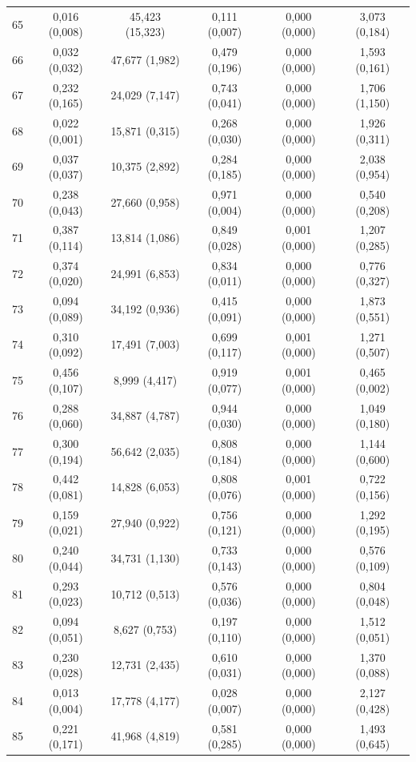 \begin{tabular}{l c c c c c}
65 & 0,016 (0,008) & 45,423 (15,323) & 0,111 (0,007) & 0,000 (0,000) & 3,073 (0,184) \\
66 & 0,032 (0,032) & 47,677 (1,982) & 0,479 (0,196) & 0,000 (0,000) & 1,593 (0,161) \\
67 & 0,232 (0,165) & 24,029 (7,147) & 0,743 (0,041) & 0,000 (0,000) & 1,706 (1,150) \\
68 & 0,022 (0,001) & 15,871 (0,315) & 0,268 (0,030) & 0,000 (0,000) & 1,926 (0,311) \\
69 & 0,037 (0,037) & 10,375 (2,892) & 0,284 (0,185) & 0,000 (0,000) & 2,038 (0,954) \\
70 & 0,238 (0,043) & 27,660 (0,958) & 0,971 (0,004) & 0,000 (0,000) & 0,540 (0,208) \\
71 & 0,387 (0,114) & 13,814 (1,086) & 0,849 (0,028) & 0,001 (0,000) & 1,207 (0,285) \\
72 & 0,374 (0,020) & 24,991 (6,853) & 0,834 (0,011) & 0,000 (0,000) & 0,776 (0,327) \\
73 & 0,094 (0,089) & 34,192 (0,936) & 0,415 (0,091) & 0,000 (0,000) & 1,873 (0,551) \\
74 & 0,310 (0,092) & 17,491 (7,003) & 0,699 (0,117) & 0,001 (0,000) & 1,271 (0,507) \\
75 & 0,456 (0,107) & 8,999 (4,417) & 0,919 (0,077) & 0,001 (0,000) & 0,465 (0,002) \\
76 & 0,288 (0,060) & 34,887 (4,787) & 0,944 (0,030) & 0,000 (0,000) & 1,049 (0,180) \\
77 & 0,300 (0,194) & 56,642 (2,035) & 0,808 (0,184) & 0,000 (0,000) & 1,144 (0,600) \\
78 & 0,442 (0,081) & 14,828 (6,053) & 0,808 (0,076) & 0,001 (0,000) & 0,722 (0,156) \\
79 & 0,159 (0,021) & 27,940 (0,922) & 0,756 (0,121) & 0,000 (0,000) & 1,292 (0,195) \\
80 & 0,240 (0,044) & 34,731 (1,130) & 0,733 (0,143) & 0,000 (0,000) & 0,576 (0,109) \\
81 & 0,293 (0,023) & 10,712 (0,513) & 0,576 (0,036) & 0,000 (0,000) & 0,804 (0,048) \\
82 & 0,094 (0,051) & 8,627 (0,753) & 0,197 (0,110) & 0,000 (0,000) & 1,512 (0,051) \\
83 & 0,230 (0,028) & 12,731 (2,435) & 0,610 (0,031) & 0,000 (0,000) & 1,370 (0,088) \\
84 & 0,013 (0,004) & 17,778 (4,177) & 0,028 (0,007) & 0,000 (0,000) & 2,127 (0,428) \\
85 & 0,221 (0,171) & 41,968 (4,819) & 0,581 (0,285) & 0,000 (0,000) & 1,493 (0,645) \\

\end{tabular}
